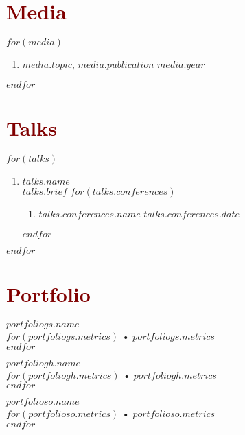 \documentclass[$fontsize$, a4paper]{article}
\begin{document}
\section*{\textcolor{Maroon}{Media}}
$for(media)$
  \begin{enumerate}
    [topsep=0pt,itemsep=0pt,parsep=0pt,partopsep=0pt,leftmargin=10pt,label=•]
    \item{$media.topic$, \href{$media.url$}{$media.publication$} \hfill $media.year$}
  \end{enumerate}
$endfor$

\section*{\textcolor{Maroon}{Talks}}
$for(talks)$
  \begin{enumerate}
    [topsep=10pt,itemsep=0pt,parsep=0pt,partopsep=0pt,leftmargin=10pt,label=•]
    \item{{\textbf{$talks.name$}}\\$talks.brief$}
    $for(talks.conferences)$
    \begin{enumerate}
      [topsep=0pt,itemsep=0pt,parsep=0pt,partopsep=0pt,leftmargin=10pt,label=•]
      \item{\href{$talks.conferences.url$}{$talks.conferences.name$} \hfill $talks.conferences.date$}
    \end{enumerate}
    $endfor$
  \end{enumerate}
$endfor$

\section*{\textcolor{Maroon}{Portfolio}}
\begin{multicols}{3}
  \textcolor{CornflowerBlue}{} \href{$portfoliogs.url$}{$portfoliogs.name$}\\
  $for(portfoliogs.metrics)$
    • $portfoliogs.metrics$\\
  $endfor$

\columnbreak
  \textcolor{Black}{} \href{$portfoliogh.url$}{$portfoliogh.name$}\\
  $for(portfoliogh.metrics)$
    • $portfoliogh.metrics$\\
  $endfor$

\columnbreak
  \textcolor{Coral}{} \href{$portfolioso.url$}{$portfolioso.name$}\\
  $for(portfolioso.metrics)$
    • $portfolioso.metrics$\\
  $endfor$
\end{multicols}
\end{document}
